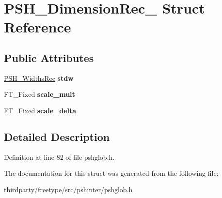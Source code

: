 \hypertarget{struct_p_s_h___dimension_rec__}{}\section{P\+S\+H\+\_\+\+Dimension\+Rec\+\_\+ Struct Reference}
\label{struct_p_s_h___dimension_rec__}
\subsection*{Public Attributes}
\begin{DoxyCompactItemize}
\item 
\mbox{\label{struct_p_s_h___dimension_rec___acf388dfaac8cb1c7ca9b5f6ad2b2f8a5}} 
\hyperlink{struct_p_s_h___widths_rec__}{P\+S\+H\+\_\+\+Widths\+Rec} {\bfseries stdw}
\item 
\mbox{\label{struct_p_s_h___dimension_rec___a0920c1e7f14cb5c759a41c14988bca80}} 
F\+T\+\_\+\+Fixed {\bfseries scale\+\_\+mult}
\item 
\mbox{\label{struct_p_s_h___dimension_rec___a7fe63fc51c731760358d242dee84cd53}} 
F\+T\+\_\+\+Fixed {\bfseries scale\+\_\+delta}
\end{DoxyCompactItemize}


\subsection{Detailed Description}


Definition at line 82 of file pshglob.\+h.



The documentation for this struct was generated from the following file\+:\begin{DoxyCompactItemize}
\item 
thirdparty/freetype/src/pshinter/pshglob.\+h\end{DoxyCompactItemize}
